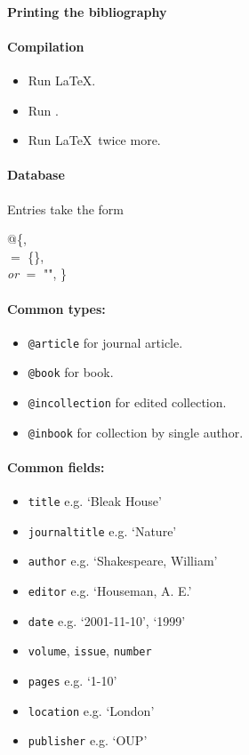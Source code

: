 \paragraph{Printing the bibliography}
\begin{pseudoverb}
\end{pseudoverb}

\paragraph{Compilation}
\begin{itemize}
\item Run \LaTeX.
\item Run .
\item Run \LaTeX\ twice more.
\end{itemize}

\paragraph{Database} Entries take the form
\begin{pseudoverb}
@\{,\\
  $=$ \{\}, \\
 \emph{or}  $=$ "",
 \}
\end{pseudoverb}

\paragraph{Common types:}
\begin{itemize}
\item \texttt{@article} for journal article.
\item \texttt{@book} for book.
\item \texttt{@incollection} for edited collection.
\item \texttt{@inbook} for collection by single author.
\end{itemize}

\paragraph{Common fields:}
\begin{itemize}
\item \texttt{title} e.g. `Bleak House'
\item \texttt{journaltitle} e.g. `Nature'
\item \texttt{author} e.g. `Shakespeare, William'
\item \texttt{editor} e.g. `Houseman, A. E.'
\item \texttt{date} e.g. `2001-11-10', `1999'
\item \texttt{volume}, \texttt{issue}, \texttt{number}
\item \texttt{pages} e.g. `1-10'
\item \texttt{location} e.g. `London'
\item \texttt{publisher} e.g. `OUP'
\end{itemize}

